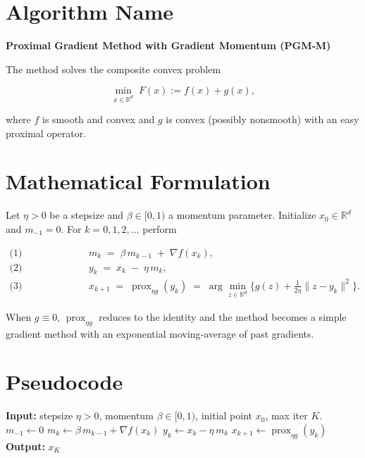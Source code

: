 \documentclass{article}
\newcommand{\prox}{\operatorname{prox}}
\newcommand{\grad}{\nabla}
\begin{document}
\section*{Algorithm Name}
\textbf{Proximal Gradient Method with Gradient Momentum (PGM‑M)}  

The method solves the composite convex problem  

\[
\min_{x\in\mathbb{R}^d}\;F(x):=f(x)+g(x),
\]

where $f$ is smooth and convex and $g$ is convex (possibly nonsmooth) with an easy proximal operator.

\section*{Mathematical Formulation}
Let $\eta>0$ be a stepsize and $\beta\in[0,1)$ a momentum parameter.  
Initialize $x_0\in\mathbb{R}^d$ and $m_{-1}=0$.  For $k=0,1,2,\dots$ perform  

\[
\begin{aligned}
\text{(1) Gradient momentum:}&\qquad 
m_k \;=\; \beta\, m_{k-1} \;+\; \grad f(x_k), \\[4pt]
\text{(2) Gradient step:}&\qquad 
y_k \;=\; x_k \;-\; \eta\, m_k, \\[4pt]
\text{(3) Proximal update:}&\qquad 
x_{k+1}\;=\;\prox_{\eta g}(y_k)
        \;=\;\arg\min_{z\in\mathbb{R}^d}\Big\{ g(z)+\frac{1}{2\eta}\|z-y_k\|^2\Big\}.
\end{aligned}
\]

When $g\equiv0$, $\prox_{\eta g}$ reduces to the identity and the method becomes a simple
gradient method with an exponential moving‑average of past gradients.

\section*{Pseudocode}
\begin{algorithm}[H]
\caption{PGM‑M}
\begin{algorithmic}[1]
\STATE \textbf{Input:} stepsize $\eta>0$, momentum $\beta\in[0,1)$, initial point $x_0$, max iter $K$.
\STATE $m_{-1}\gets 0$
    \STATE $m_k \gets \beta\,m_{k-1}+\grad f(x_k)$ \hfill{}
    \STATE $y_k \gets x_k-\eta\,m_k$ \hfill{}
    \STATE $x_{k+1}\gets \prox_{\eta g}(y_k)$ \hfill{}
\ENDFOR
\STATE \textbf{Output:} $x_K$
\end{algorithmic}
\end{algorithm}
\end{document}
